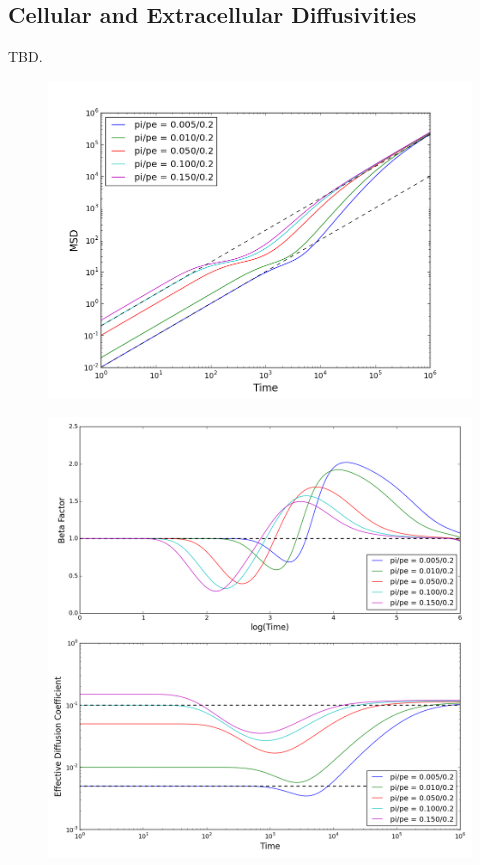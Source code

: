 \subsection{Cellular and Extracellular Diffusivities}
\label{sec:2D-cellular-extracellular-diffusivities}	
	TBD.
	\begin{figure}[h]
		\centering
		\includegraphics[width=1.0\linewidth]{../images/2D/pipe_msd_2D}
		\caption{}
		\label{fig:pipe_msd_2D}
	\end{figure}
	
	\begin{figure}[h]
		\centering
		\includegraphics[width=1.0\linewidth]{../images/2D/pipe_beta_deff_2D}
		\caption{}
		\label{fig:pipe_beta_deff_2D}
	\end{figure}
	
